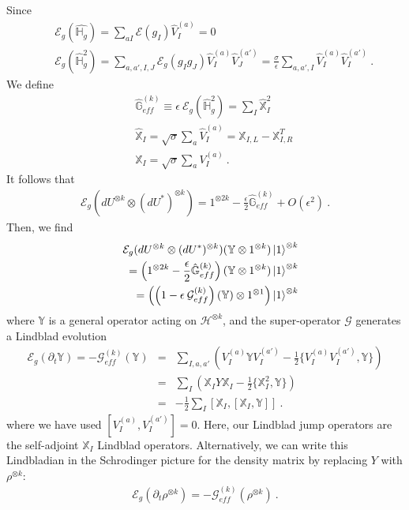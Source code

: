\documentclass{article}
\theoremstyle{definition}
\newcommand{\nn}{\nonumber}
\newcommand{\lb}{\left(}
\newcommand{\rb}{\right)}
\newcommand{\ep}{\epsilon}
\newcommand{\p}{\partial}
\begin{document}
    Since
    \begin{eqnarray}
        &&\mathcal{E}_g(\hat{\mathbb{H}_g})=\sum_{a I}\mathcal{E}(g_I)\hat{V}_I^{(a)}=0\nn\\
        &&\mathcal{E}_g(\hat{\mathbb{H}}_g^2)=\sum_{a,a',I,J}\mathcal{E}_g(g_Ig_J)\hat{V}^{(a)}_I
        \hat{V}_J^{(a')}=\frac{\sigma}{\ep}\sum_{a,a',I} \hat{V}_I^{(a)}\hat{V}_I^{(a')}\ .
    \end{eqnarray}
    We define
    \begin{eqnarray}
        &&\hat{\mathbb{G}}_{eff}^{(k)}\equiv \ep\: \mathcal{E}_g\lb \hat{\mathbb{H}}_g^2\rb=\sum_I
        \hat{\mathbb{X}}_I^2\nn\\
        &&\hat{\mathbb{X}}_I=\sqrt{\sigma}\sum_a \hat{V}_I^{(a)}=\mathbb{X}_{I,L}-\mathbb{X}_{I,R}^T\nn\\
        &&\mathbb{X}_{I}=\sqrt{\sigma}\sum_a V_I^{(a)}\ .
    \end{eqnarray}
    It follows that
    \begin{eqnarray}
        \mathcal{E}_g(dU^{\otimes k}\otimes (dU^*)^{\otimes k})= 1^{\otimes 2k}-\frac{\ep}{2}\hat{\mathbb{G}}_{eff}^{(k)}+O(\ep^2)\ .
    \end{eqnarray}
    Then, we find
    \begin{eqnarray}
        &&\mathcal{E}_g(dU^{\otimes k}\otimes (dU^*)^{\otimes k})(\mathbb{Y}\otimes
        1^{\otimes k})\ket{1}^{\otimes k}\nn\\
        &&=\lb 1^{\otimes 2k}-\frac{\ep}{2}\hat{\mathbb{G}}_{eff}^{(k)}\rb(\mathbb{Y}\otimes
        1^{\otimes k})\ket{1}^{\otimes k}\nn\\
        &&=\lb \lb 1-\ep \:\mathcal{G}_{eff}^{(k)}\rb(\mathbb{Y})\otimes 1^{\otimes 1}\rb\ket{1}^{\otimes k}
    \end{eqnarray}
    where $\mathbb{Y}$ is a general operator acting on $\mathcal{H}^{\otimes k}$,
    and the super-operator $\mathcal{G}$ generates a Lindblad evolution
    \begin{eqnarray}
        \mathcal{E}_g(\p_t \mathbb{Y})=-\mathcal{G}_{eff}^{(k)}(\mathbb{Y})&=&\sum_{I,a,a'}\lb
        V_I^{(a)} \mathbb{Y} V_I^{(a')}-\frac{1}{2}\{ V_I^{(a)}V_I^{(a')},\mathbb{Y}\}\rb\nn\\
        &=&\sum_I \lb \mathbb{X}_I Y \mathbb{X}_I-\frac{1}{2}\{\mathbb{X}_I^2,\mathbb{Y}\}\rb\nn\\
        &=&-\frac{1}{2}\sum_I [\mathbb{X}_I,[\mathbb{X}_I,\mathbb{Y}]]\ .
    \end{eqnarray}
    where we have used $[V_{I}^{(a)},V_{I}^{(a')}]=0$. Here, our Lindblad jump
    operators are the self-adjoint $\mathbb{X}_{I}$ Lindblad operators. Alternatively,
    we can write this Lindbladian in the Schrodinger picture for the density
    matrix by replacing $Y$ with $\rho^{\otimes k}$:
    \begin{eqnarray}
        \mathcal{E}_g(\p_t \rho^{\otimes k})=-\mathcal{G}_{eff}^{(k)}(\rho^{\otimes k})\ .
    \end{eqnarray}
\end{document}
